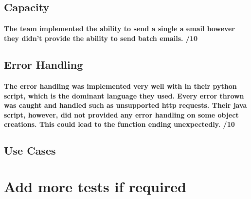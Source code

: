 \documentclass[11pt]{article}
\begin{document}
		\subsection{Capacity}
			\paragraph{The team implemented the ability to send a single a email however they didn't provide the ability to send batch emails. /10}
		\subsection{Error Handling}
		    \paragraph{The error handling was implemented very well with in their python script, which is the dominant language they used. Every error thrown was caught and handled such as unsupported http requests. Their java script, however, did not provided any error handling on some object creations. This could lead to the function ending unexpectedly. /10}
		\subsection{Use Cases} 
			\paragraph{}
	\section{Add more tests if required}


	
	
\end{document}

